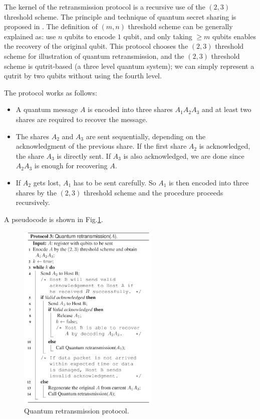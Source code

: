\documentclass[10pt]{article}
\begin{document}
The kernel of the retransmission protocol is a recursive use of the $(2,3)$ threshold scheme. The principle and technique of quantum secret sharing is proposed in \cite{cleve1999share}. The definition of $(m,n)$ threshold scheme can be generally explained as: use $n$ qubits to encode $1$ qubit, and only taking $\geq m$ qubits enables the recovery of the original qubit. This protocol chooses the $(2,3)$ threshold scheme for illustration of quantum retransmission, and the $(2,3)$ threshold scheme is qutrit-based (a three level quantum system); we can simply represent a qutrit by two qubits without using the fourth level. 

The protocol works as follows:
\begin{itemize}
    \item A quantum message $A$ is encoded into three shares $A_1A_2A_3$ and at least two shares are required to recover the message.
    \item The shares $A_2$ and $A_3$ are sent sequentially, depending on the acknowledgment of the previous share. If the first share $A_2$ is acknowledged, the share $A_3$ is directly sent. If $A_3$ is also acknowledged, we are done since $A_2A_3$ is enough for recovering $A$. 
    \item If $A_2$ gets lost, $A_1$ has to be sent carefully. So $A_1$ is then encoded into three shares by the $(2,3)$ threshold scheme and the procedure proceeds recursively.
\end{itemize}

A pseudocode is shown in Fig.\ref{retransmission}.

\begin{figure}[htbp]
    \centering
    \includegraphics[width=0.6\textwidth]{figure/algo.jpg}
    \caption{Quantum retransmission protocol.}
    \label{retransmission}
\end{figure}



\end{document}
